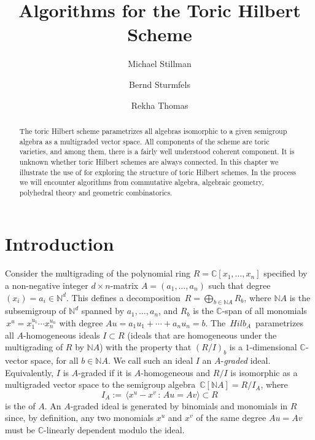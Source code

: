 \def\A{\mathbb{A}}
\def\k{\mathbb{C}}
\def\N{\mathbb{N}}
\def\R{\mathbb{R}}
\def\P{\mathbb{P}}
\def\ZZ{\mathbb{Z}} 

\title{Algorithms for the Toric Hilbert Scheme}
\author{Michael Stillman
         \and Bernd Sturmfels
         \and Rekha Thomas 
        }
\maketitle

\begin{abstract}
The toric Hilbert scheme parametrizes all algebras isomorphic to a
given semigroup algebra as a multigraded vector space. All components
of the scheme are toric varieties, and among them, there is a fairly
well understood coherent component. It is unknown whether
toric Hilbert schemes are always connected. In this chapter we
illustrate the use of \Mtwo for exploring the structure of toric
Hilbert schemes. In the process we will encounter algorithms from
commutative algebra, algebraic geometry, polyhedral theory and
geometric combinatorics.
\end{abstract}

\section*{Introduction}
Consider the multigrading of the polynomial ring $R =
\k[x_1,\ldots,x_n]$ specified by a non-negative integer $d \times
n$-matrix $A = (a_1,\ldots,a_n)$ such that degree $(x_i) = a_i \in
\N^d$. This defines a decomposition $\, R = \bigoplus_{b \in \N A} R_b
$, where $\N A$ is the subsemigroup of $\N^d$ spanned by
$a_1,\ldots,a_n$, and $R_b$ is the $\k$-span of all monomials $\, x^u
= x_1^{u_1}\cdots x_n^{u_n}$ with degree $Au = a_1 u_1 +\cdots + a_n
u_n = b$.  The {\it {}} $\,Hilb_A 
\,$ parametrizes all $A$-homogeneous ideals $I \subset R$ (ideals that
are homogeneous under the multigrading of $R$ by $\N A$) with the
property that $(R/I)_b$ is a $1$-dimensional $\k$-vector space, for all
$b \in \N A$. We call such an ideal $I$ an $A$-{\em graded} ideal.
Equivalently, $I$ is $A$-graded if it is $A$-homogeneous and $R/I$ is
isomorphic as a multigraded vector space to the semigroup algebra $\,
\k [ \N A ] = R/I_A$, where $$I_A := \,\langle x^u - x^v \, : \, Au =
Av \rangle \subset R$$ is the {\it {}} of $A$. An $A$-graded
ideal is generated by binomials and monomials in $R$ since, by
definition, any two monomials $x^u$ and $x^v$ of the same degree $Au = 
Av$ must be $\k$-linearly dependent modulo the ideal.

